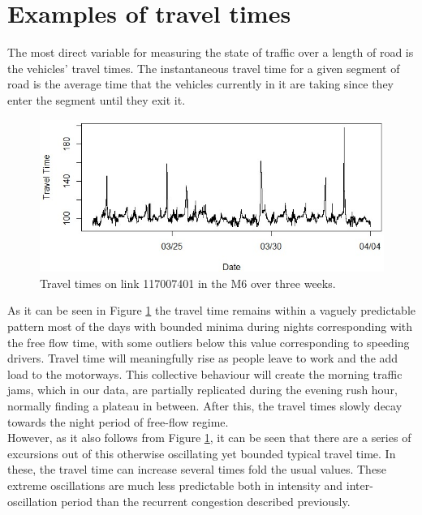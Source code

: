\documentclass[conference, letterpaper]{IEEEtran}
\begin{document}
\section{Examples of travel times} 
The most direct variable for measuring the state of traffic over a length of road is the vehicles' travel times. 
The instantaneous travel time for a given segment of road is the average time that the vehicles currently in it are taking since they enter the segment until they exit it.\\

\begin{figure}[htbp]
	\centerline{\includegraphics[width=\linewidth]{./images/Traveltime_example2.jpg}}
	\caption{Travel times on link 117007401 in the M6 over three weeks.}
	\label{fig:travel_time_example}
\end{figure}

As it can be seen in Figure \ref{fig:travel_time_example} the travel time remains within a vaguely predictable pattern most of the days with bounded minima during nights corresponding with the free flow time, with some outliers below this value corresponding to speeding drivers. 
Travel time will meaningfully rise as people leave to work and the add load to the motorways. 
This collective behaviour will create the morning traffic jams, which in our data, are partially replicated during the evening rush hour, normally finding a plateau in between. 
After this, the travel times slowly decay towards the night period of free-flow regime.\\

However, as it also follows from Figure \ref{fig:travel_time_example}, it can be seen that there are a series of excursions out of this otherwise oscillating yet bounded typical travel time. 
In these, the travel time can increase several times fold the usual values. These extreme oscillations are much less predictable both in intensity and inter-oscillation period than the recurrent congestion described previously.
 
\end{document}
